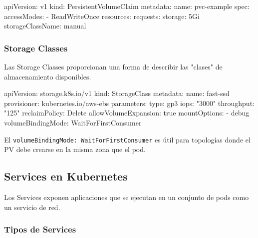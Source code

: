 \documentclass[11pt,a4paper]{article}
\begin{document}
\begin{commandbox}
apiVersion: v1
kind: PersistentVolumeClaim
metadata:
  name: pvc-example
spec:
  accessModes:
    - ReadWriteOnce
  resources:
    requests:
      storage: 5Gi
  storageClassName: manual
\end{commandbox}

\subsubsection{Storage Classes}

Las Storage Classes proporcionan una forma de describir las "clases" de almacenamiento disponibles.

\begin{commandbox}
apiVersion: storage.k8s.io/v1
kind: StorageClass
metadata:
  name: fast-ssd
provisioner: kubernetes.io/aws-ebs
parameters:
  type: gp3
  iops: "3000"
  throughput: "125"
reclaimPolicy: Delete
allowVolumeExpansion: true
mountOptions:
  - debug
volumeBindingMode: WaitForFirstConsumer
\end{commandbox}

\begin{tipbox}
El \texttt{volumeBindingMode: WaitForFirstConsumer} es útil para topologías donde el PV debe crearse en la misma zona que el pod.
\end{tipbox}

\subsection{Services en Kubernetes}

Los Services exponen aplicaciones que se ejecutan en un conjunto de pods como un servicio de red.

\subsubsection{Tipos de Services}
\end{document}
